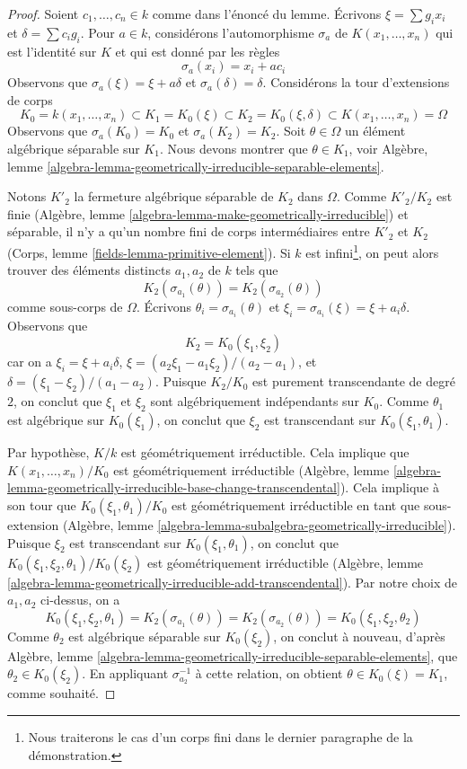 \begin{proof}
Soient $c_1, \ldots, c_n \in k$ comme dans l'énoncé du lemme.
Écrivons $\xi = \sum g_ix_i$ et $\delta = \sum c_ig_i$.
Pour $a \in k$, considérons l'automorphisme $\sigma_a$
de $K(x_1, \ldots, x_n)$ qui est l'identité sur $K$ et qui est donné par les règles
$$
\sigma_a(x_i) = x_i + a c_i
$$
Observons que $\sigma_a(\xi) = \xi + a \delta$ et $\sigma_a(\delta) = \delta$.
Considérons la tour d'extensions de corps
$$
K_0 = k(x_1, \ldots, x_n) \subset
K_1 = K_0(\xi) \subset
K_2 = K_0(\xi, \delta) \subset K(x_1, \ldots, x_n) = \Omega
$$
Observons que $\sigma_a(K_0) = K_0$ et $\sigma_a(K_2) = K_2$.
Soit $\theta \in \Omega$ un élément algébrique séparable sur $K_1$.
Nous devons montrer que $\theta \in K_1$, voir Algèbre, lemme
\ref{algebra-lemma-geometrically-irreducible-separable-elements}.

\medskip\noindent
Notons $K'_2$ la fermeture algébrique séparable de $K_2$ dans $\Omega$.
Comme $K'_2/K_2$ est finie (Algèbre, lemme
\ref{algebra-lemma-make-geometrically-irreducible}) et
séparable, il n'y a qu'un nombre fini de corps intermédiaires entre
$K'_2$ et $K_2$ (Corps, lemme \ref{fields-lemma-primitive-element}).
Si $k$ est infini\footnote{Nous traiterons le cas d'un corps fini dans le
dernier paragraphe de la démonstration.}, on peut alors trouver des éléments distincts
$a_1, a_2$ de $k$ tels que
$$
K_2(\sigma_{a_1}(\theta)) = K_2(\sigma_{a_2}(\theta))
$$
comme sous-corps de $\Omega$. Écrivons $\theta_i = \sigma_{a_i}(\theta)$
et $\xi_i = \sigma_{a_i}(\xi) = \xi + a_i \delta$. Observons que
$$
K_2 = K_0(\xi_1, \xi_2)
$$
car on a $\xi_i = \xi + a_i \delta$,
$\xi = (a_2 \xi_1 - a_1 \xi_2)/(a_2 - a_1)$, et
$\delta = (\xi_1 - \xi_2)/(a_1 - a_2)$.
Puisque $K_2/K_0$ est purement transcendante de degré $2$, on conclut
que $\xi_1$ et $\xi_2$ sont algébriquement indépendants sur $K_0$.
Comme $\theta_1$ est algébrique sur $K_0(\xi_1)$, on conclut que
$\xi_2$ est transcendant sur $K_0(\xi_1, \theta_1)$.

\medskip\noindent
Par hypothèse, $K/k$ est géométriquement irréductible. Cela implique
que $K(x_1, \ldots, x_n)/K_0$ est géométriquement irréductible
(Algèbre, lemme
\ref{algebra-lemma-geometrically-irreducible-base-change-transcendental}).
Cela implique à son tour que $K_0(\xi_1, \theta_1)/K_0$
est géométriquement irréductible en tant que sous-extension
(Algèbre, lemme \ref{algebra-lemma-subalgebra-geometrically-irreducible}).
Puisque $\xi_2$ est transcendant sur $K_0(\xi_1, \theta_1)$,
on conclut que $K_0(\xi_1, \xi_2, \theta_1)/K_0(\xi_2)$
est géométriquement irréductible (Algèbre, lemme
\ref{algebra-lemma-geometrically-irreducible-add-transcendental}).
Par notre choix de $a_1, a_2$ ci-dessus, on a
$$
K_0(\xi_1, \xi_2, \theta_1) =
K_2(\sigma_{a_1}(\theta)) =
K_2(\sigma_{a_2}(\theta)) =
K_0(\xi_1, \xi_2, \theta_2)
$$
Comme $\theta_2$ est algébrique séparable sur $K_0(\xi_2)$,
on conclut à nouveau, d'après Algèbre, lemme
\ref{algebra-lemma-geometrically-irreducible-separable-elements}, que
$\theta_2 \in K_0(\xi_2)$. En appliquant $\sigma_{a_2}^{-1}$
à cette relation, on obtient $\theta \in K_0(\xi) = K_1$, comme souhaité.


\end{proof}

